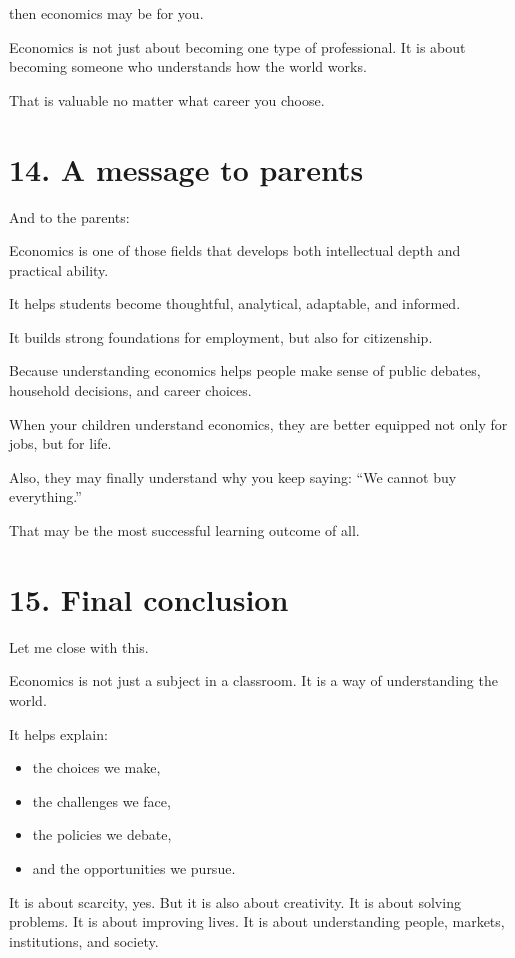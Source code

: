 \documentclass[12pt]{article}
\begin{document}
then economics may be for you.

Economics is not just about becoming one type of professional.  
It is about becoming someone who understands how the world works.

That is valuable no matter what career you choose.

\section*{14. A message to parents}

And to the parents:

Economics is one of those fields that develops both intellectual depth and practical ability.

It helps students become thoughtful, analytical, adaptable, and informed.

It builds strong foundations for employment, but also for citizenship.

Because understanding economics helps people make sense of public debates, household decisions, and career choices.

When your children understand economics, they are better equipped not only for jobs, but for life.

Also, they may finally understand why you keep saying:  
``We cannot buy everything.''

That may be the most successful learning outcome of all.

\section*{15. Final conclusion}

Let me close with this.

Economics is not just a subject in a classroom.  
It is a way of understanding the world.

It helps explain:
\begin{itemize}[leftmargin=2em]
    \item the choices we make,
    \item the challenges we face,
    \item the policies we debate,
    \item and the opportunities we pursue.
\end{itemize}

It is about scarcity, yes.  
But it is also about creativity.  
It is about solving problems.  
It is about improving lives.  
It is about understanding people, markets, institutions, and society.
\end{document}
